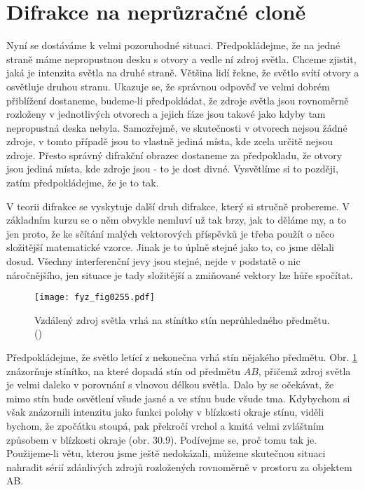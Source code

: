   \section{Difrakce na neprůzračné cloně}\label{fyz:IchapXXXsecVI}
    Nyní se dostáváme k velmi pozoruhodné situaci. Předpokládejme, že na jedné straně máme 
    nepropustnou desku s otvory a vedle ní zdroj světla. Chceme zjistit, jaká je intenzita světla 
    na druhé straně. Většina lidí řekne, že světlo svítí otvory a osvětluje druhou stranu. Ukazuje 
    se, že správnou odpověď ve velmi dobrém přiblížení dostaneme, budeme-li předpokládat, že zdroje 
    světla jsou rovnoměrně rozloženy v jednotlivých otvorech a jejich fáze jsou takové jako kdyby 
    tam nepropustná deska nebyla. Samozřejmě, ve skutečnosti v otvorech nejsou žádné zdroje, v 
    tomto případě jsou to vlastně jediná místa, kde zcela určitě nejsou zdroje. Přesto správný 
    difrakční obrazec dostaneme za předpokladu, že otvory jsou jediná místa, kde zdroje jsou - to 
    je dost divné. Vysvětlíme si to později, zatím předpokládejme, že je to tak.
    
    V teorii difrakce se vyskytuje další druh difrakce, který si stručně probereme. V základním 
    kurzu se o něm obvykle nemluví už tak brzy, jak to děláme my, a to jen proto, že ke sčítání 
    malých vektorových příspěvků je třeba použít o něco složitější matematické vzorce. Jinak je to 
    úplně stejné jako to, co jsme dělali dosud. Všechny interferenční jevy jsou stejné, nejde v 
    podstatě o nic náročnějšího, jen situace je tady složitější a zmiňované vektory lze hůře 
    spočítat.

    \begin{figure}[ht!] %
      \centering
      \texttt{[image: fyz\_fig0255.pdf]}
      \caption{Vzdálený zdroj světla vrhá na stínítko stín neprůhledného předmětu.
               (\cite[s.~402]{Feynman01})}
      \label{fyz:fig0255}
    \end{figure}
    
    Předpokládejme, že světlo letící z nekonečna vrhá stín nějakého předmětu. Obr. \ref{fyz:fig0255} 
    znázorňuje stínítko, na které dopadá stín od předmětu \(AB\), přičemž zdroj světla je velmi 
    daleko v porovnání s vlnovou délkou světla. Dalo by se očekávat, že mimo stín bude osvětlení 
    všude jasné a ve stínu bude všude tma. Kdybychom si však znázornili intenzitu jako funkci 
    polohy v blízkosti okraje stínu, viděli bychom, že zpočátku stoupá, pak překročí vrchol a kmitá 
    velmi zvláštním způsobem v blízkosti okraje (obr. 30.9). Podívejme se, proč tomu tak je. 
    Použijeme-li větu, kterou jsme ještě nedokázali, můžeme skutečnou situaci nahradit sérií 
    zdánlivých zdrojů rozložených rovnoměrně v prostoru za objektem AB.


